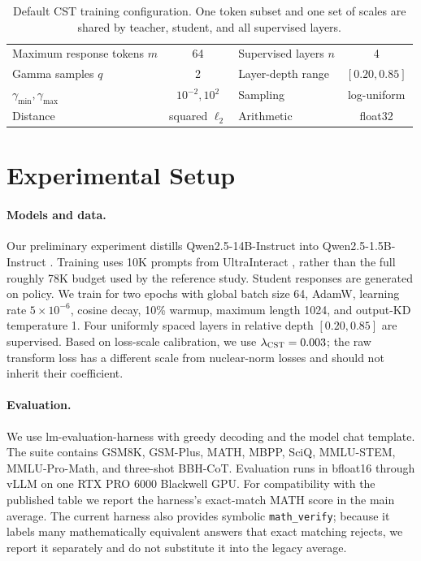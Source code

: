\documentclass{article}
\newcommand{\cst}{\textsc{CST}}
\begin{document}
\begin{table}[t]
\caption{Default \cst{} training configuration.  One token subset and one set
of scales are shared by teacher, student, and all supervised layers.}
\label{tab:config}
\centering
\small
\begin{tabular}{lc@{\qquad}lc}
\toprule
Maximum response tokens $m$ & 64 & Supervised layers $n$ & 4\\
Gamma samples $q$ & 2 & Layer-depth range & $[0.20,0.85]$\\
$\gamma_{\min},\gamma_{\max}$ & $10^{-2},10^2$ & Sampling & log-uniform\\
Distance & squared $\ell_2$ & Arithmetic & float32\\
\bottomrule
\end{tabular}
\end{table}

\section{Experimental Setup}

\paragraph{Models and data.}
Our preliminary experiment distills Qwen2.5-14B-Instruct into
Qwen2.5-1.5B-Instruct \citep{qwen2024qwen25}.  Training uses 10K prompts from
UltraInteract \citep{yuan2024ultrainteract}, rather than the full roughly 78K
budget used by the reference study.  Student responses are generated on
policy.  We train for two epochs with global batch size 64, AdamW, learning
rate $5\times10^{-6}$, cosine decay, 10\% warmup, maximum length 1024, and
output-KD temperature 1.  Four uniformly spaced layers in relative depth
$[0.20,0.85]$ are supervised.  Based on loss-scale calibration, we use
$\lambda_{\cst}=0.003$; the raw transform loss has a different scale from
nuclear-norm losses and should not inherit their coefficient.

\paragraph{Evaluation.}
We use lm-evaluation-harness with greedy decoding and the model chat template.
The suite contains GSM8K, GSM-Plus, MATH, MBPP, SciQ, MMLU-STEM,
MMLU-Pro-Math, and three-shot BBH-CoT.  Evaluation runs in bfloat16 through
vLLM on one RTX PRO 6000 Blackwell GPU.  For compatibility with the published
table we report the harness's exact-match MATH score in the main average.  The
current harness also provides symbolic \texttt{math\_verify}; because it
labels many mathematically equivalent answers that exact matching rejects, we
report it separately and do not substitute it into the legacy average.
\end{document}
